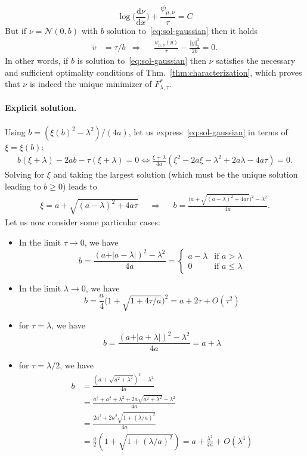 \documentclass[11pt]{article}
\newcommand{\rev}[1]{{#1}}
\newcommand{\Nn}{\mathcal{N}}
\renewcommand{\d}{\mathrm{d}}
\begin{document}
$$
\log\Big(\frac{\d\nu}{\d x}\Big) +\frac{\psi_{\mu,\nu}}{\tau} = C 
$$
But if $\nu=\Nn(0,b)$ with $b$ solution to~\eqref{eq:sol-gaussian} then it holds
\begin{align}
\tilde v &=\tau/b&\Rightarrow&&\frac{\psi_{\mu,\nu}(y)}{\tau} - \frac{\Vert y\Vert^2_2}{2b}=0.
\end{align}
\rev{In other words, if $b$ is solution to~\eqref{eq:sol-gaussian} then $\nu$ satisfies the necessary and sufficient optimality conditions of Thm.~\ref{thm:characterization}, which proves that $\nu$ is indeed the unique minimizer of $F^*_{\lambda,\tau}$.}
\paragraph{Explicit solution.} Using $b=(\xi(b)^2-\lambda^2)/(4a)$, let us express~\eqref{eq:sol-gaussian} in terms of $\xi=\xi(b)$:
\begin{align*}
b(\xi+\lambda)-2ab-\tau(\xi+\lambda)=0 \Leftrightarrow \frac{\xi+\lambda}{4a}(\xi^2-2a\xi-\lambda^2+2a\lambda-4a\tau)=0.
\end{align*}
Solving for $\xi$ and taking the largest solution (which must be the unique solution leading to $b\geq 0$) leads to
\begin{align*}
\xi = a+\sqrt{(a-\lambda)^2+4a\tau} &&\Rightarrow&& b = \frac{\big(a+\sqrt{(a-\lambda)^2+4a\tau}\big)^2-\lambda^2}{4a}.
\end{align*}
Let us now consider some particular cases:
\begin{itemize}
\item In the limit $\tau\to 0$, we have
$$
b= \frac{(a+\vert a-\lambda\vert)^2-\lambda^2}{4a} =
\begin{cases}
a-\lambda &\text{if $a>\lambda$}\\
0 &\text{if $a\leq \lambda$}
\end{cases}
$$
\item In the limit $\lambda\to0$, we have
$$
b = \frac{a}{4}\big( 1+\sqrt{1+4\tau/a}\big)^2 = a+2\tau+O(\tau^2)
$$
\item for $\tau=\lambda$, we have
$$
b= \frac{(a+\vert a+\lambda\vert)^2-\lambda^2}{4a} = a +\lambda
$$
\item for $\tau=\lambda/2$, we have
\begin{align*}
b &=  \frac{(a+\sqrt{ a^2 +\lambda^2})^2-\lambda^2}{4a} \\
&= \frac{a^2+a^2+\lambda^2+2a\sqrt{ a^2 +\lambda^2}-\lambda^2}{4a} \\
&=\frac{2a^2+2a^2\sqrt{ 1 +(\lambda/a)^2}}{4a}\\
&=\frac{a}{2}(1+\sqrt{1+(\lambda/a)^2}) =a+\frac{\lambda^2}{4a}+O(\lambda^4)
\end{align*}
\end{itemize}
\end{document}

